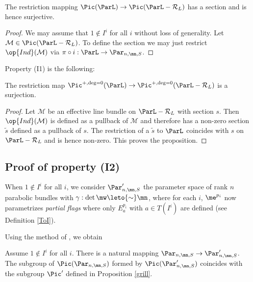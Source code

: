 \begin{lemma}
\notready\label{prius2}
The restriction mapping $\Pic(\ParL)\to \Pic(\ParL -\mathcal{R}_L)$ has a section and is hence surjective.
\end{lemma}
\begin{proof}
We may assume that $1\not\in I^i$ for all $i$ without loss of generality. Let $\mathcal{M}\in\Pic(\ParL -\mathcal{R}_L)$. To define the section we may just restrict
$\op{Ind}(\mathcal{M})$  via $\pi\circ i:\ParL \to \Par_{n,\mn,S}$.
\end{proof}
Property (I1) is the following:
\begin{proposition}
\notready\label{M11}
The restriction map $\Pic^{+,\deg=0}(\ParL)\to \Pic^{+,\deg=0}(\ParL -\mathcal{R}_L)$ is a surjection.
\end{proposition}
\begin{proof}
Let $\mathcal{M}$ be an effective line bundle on $\ParL -\mathcal{R}_L$ with section $s$. Then $\op{Ind}(\mathcal{M})$ is defined as a pullback of $\mathcal{M}$ and   therefore has a non-zero section $\tilde{s}$ defined as a pullback of $s$. The restriction of a $\tilde{s}$  to $\ParL$ coincides with $s$ on $\ParL -\mathcal{R}_L$ and is hence non-zero. This proves the proposition.
\end{proof}



\subsection{Proof of property (I2)}

\begin{defi}
\notready  When $1\not\in I^i$ for all $i$, we consider $\Par'_{n,\mn,S}$ the parameter space of rank $n$ parabolic bundles with $\gamma:\det \mw\leto{\sim}\mn$, where for each $i$,  $\me^{p_i}$ now parametrizes {\em partial flags} where only $E^{p_i}_a$ with $a\in T(I^i)$ are defined (see Definition  \ref{ToI}).
\end{defi}
Using  the method of \cite{LS}, we obtain
\begin{lemma}
\notready
 Assume $1\not\in I^i$ for all $i$. There is a natural mapping $\Par_{n,\mn,S}\to \Par'_{n,\mn,S}$.
The subgroup of $\Pic(\Par_{n,\mn,S})$ formed by $\Pic(\Par'_{n,\mn,S})$ coincides with the subgroup
$\Pic'$ defined in Proposition \ref{grill}.
\end{lemma}

